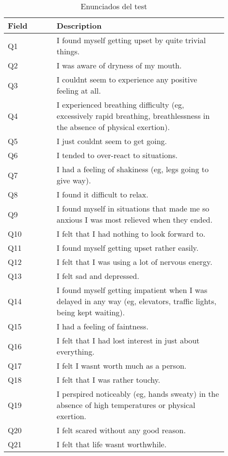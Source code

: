 \begin{appendices}
\begin{table}[ht]
\centering
\caption{Enunciados del test}
\begin{tabular}{p{0.2\linewidth} | p{0.7\linewidth}}

\toprule
Field &                                                                                                                          Description \\
\midrule
 Q1 &  I found myself getting upset by quite trivial things. \\
 Q2 &  I was aware of dryness of my mouth. \\
 Q3 &  I couldnt seem to experience any positive feeling at all. \\
 Q4 &  I experienced breathing difficulty (eg, excessively rapid breathing, breathlessness in the absence of physical exertion). \\
 Q5 &  I just couldnt seem to get going. \\
 Q6 &  I tended to over-react to situations. \\
 Q7 &  I had a feeling of shakiness (eg, legs going to give way). \\
 Q8 &  I found it difficult to relax. \\
 Q9 &  I found myself in situations that made me so anxious I was most relieved when they ended. \\
 Q10 &  I felt that I had nothing to look forward to. \\
 Q11 &  I found myself getting upset rather easily. \\
 Q12 &  I felt that I was using a lot of nervous energy. \\
 Q13 &  I felt sad and depressed. \\
 Q14 &  I found myself getting impatient when I was delayed in any way (eg, elevators, traffic lights, being kept waiting). \\
 Q15 &  I had a feeling of faintness. \\
 Q16 &  I felt that I had lost interest in just about everything. \\
 Q17 &  I felt I wasnt worth much as a person. \\
 Q18 &  I felt that I was rather touchy. \\
 Q19 &  I perspired noticeably (eg, hands sweaty) in the absence of high temperatures or physical exertion. \\
 Q20 &  I felt scared without any good reason. \\
 Q21 &  I felt that life wasnt worthwhile. \\

\end{tabular}
\end{table}
\end{appendices}
